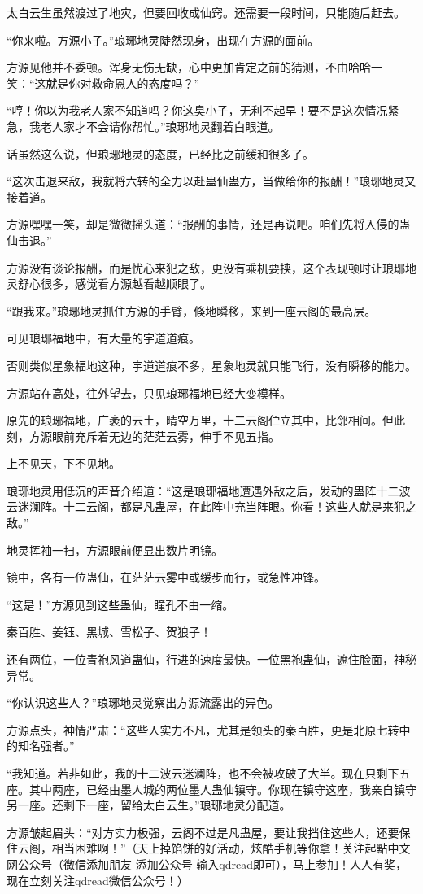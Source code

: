 \begin{this_body}
太白云生虽然渡过了地灾，但要回收成仙窍。还需要一段时间，只能随后赶去。

“你来啦。方源小子。”琅琊地灵陡然现身，出现在方源的面前。

方源见他并不委顿。浑身无伤无缺，心中更加肯定之前的猜测，不由哈哈一笑：“这就是你对救命恩人的态度吗？”

“哼！你以为我老人家不知道吗？你这臭小子，无利不起早！要不是这次情况紧急，我老人家才不会请你帮忙。”琅琊地灵翻着白眼道。

话虽然这么说，但琅琊地灵的态度，已经比之前缓和很多了。

“这次击退来敌，我就将六转的全力以赴蛊仙蛊方，当做给你的报酬！”琅琊地灵又接着道。

方源嘿嘿一笑，却是微微摇头道：“报酬的事情，还是再说吧。咱们先将入侵的蛊仙击退。”

方源没有谈论报酬，而是忧心来犯之敌，更没有乘机要挟，这个表现顿时让琅琊地灵舒心很多，感觉看方源越看越顺眼了。

“跟我来。”琅琊地灵抓住方源的手臂，倏地瞬移，来到一座云阁的最高层。

可见琅琊福地中，有大量的宇道道痕。

否则类似星象福地这种，宇道道痕不多，星象地灵就只能飞行，没有瞬移的能力。

方源站在高处，往外望去，只见琅琊福地已经大变模样。

原先的琅琊福地，广袤的云土，晴空万里，十二云阁伫立其中，比邻相间。但此刻，方源眼前充斥着无边的茫茫云雾，伸手不见五指。

上不见天，下不见地。

琅琊地灵用低沉的声音介绍道：“这是琅琊福地遭遇外敌之后，发动的蛊阵十二波云迷澜阵。十二云阁，都是凡蛊屋，在此阵中充当阵眼。你看！这些人就是来犯之敌。”

地灵挥袖一扫，方源眼前便显出数片明镜。

镜中，各有一位蛊仙，在茫茫云雾中或缓步而行，或急性冲锋。

“这是！”方源见到这些蛊仙，瞳孔不由一缩。

秦百胜、姜钰、黑城、雪松子、贺狼子！

还有两位，一位青袍风道蛊仙，行进的速度最快。一位黑袍蛊仙，遮住脸面，神秘异常。

“你认识这些人？”琅琊地灵觉察出方源流露出的异色。

方源点头，神情严肃：“这些人实力不凡，尤其是领头的秦百胜，更是北原七转中的知名强者。”

“我知道。若非如此，我的十二波云迷澜阵，也不会被攻破了大半。现在只剩下五座。其中两座，已经由墨人城的两位墨人蛊仙镇守。你现在镇守这座，我亲自镇守另一座。还剩下一座，留给太白云生。”琅琊地灵分配道。

方源皱起眉头：“对方实力极强，云阁不过是凡蛊屋，要让我挡住这些人，还要保住云阁，相当困难啊！”（天上掉馅饼的好活动，炫酷手机等你拿！关注起點中文网公众号（微信添加朋友-添加公众号-输入qdread即可），马上参加！人人有奖，现在立刻关注qdread微信公众号！）

\end{this_body}


